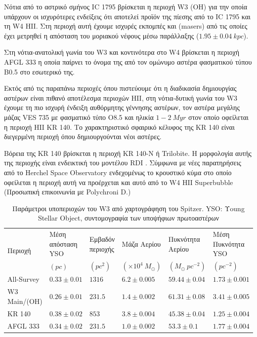 \documentclass[a4paper,12pt]{memoir}
\newcommand{\e}[1]{\times 10^{#1}}
\begin{document}
Νότια από το αστρικό σμήνος IC 1795 βρίσκεται η περιοχή W3 (OH) για την οποία υπάρχουν οι ισχυρότερες ενδείξεις ότι αποτελεί προϊόν της πίεσης από το IC 1795 και τη  W4 HII. Στη περιοχή αυτή έχουμε ισχυρές εκπομπές  και  (masers) από τις οποίες έχει μετρηθεί η απόσταση του μοριακού νέφους μέσω παράλλαξης ($1.95 \pm 0.04 \ kpc$).

Στη νότια-ανατολική γωνία του W3 και κοντινότερα στο W4 βρίσκεται η περιοχή AFGL 333 η οποία παίρνει το όνομα της από τον ομώνυμο αστέρα φασματικού τύπου B0.5 στο εσωτερικό της. 

Εκτός από τις παραπάνω περιοχές όπου πιστεύουμε ότι η διαδικασία δημιουργίας αστέρων είναι πιθανό αποτέλεσμα περιοχών HII, στη νότια-δυτική γωνία του W3 έχουμε τη πιο ισχυρή ένδειξη αυθόρμητης γέννησης αστέρων, τον αστέρα μεγάλης μάζας VES 735 με φασματικό τύπο O8.5 και ηλικία $1-2 \ Myr$ στον οποίο οφείλεται η περιοχή HII KR 140. Το χαρακτηριστικό σφαιρικό κέλυφος της KR 140 είναι διεγερμένη περιοχή όπου δημιουργούνται νέοι αστέρες. 

Βόρεια της KR 140 βρίσκεται η περιοχή KR 140-N ή Trilobite. Η μορφολογία αυτής της περιοχής είναι ενδεικτική του μοντέλου RDI \cite{rivera-ingraham_2013}. Σύμφωνα με νέες παρατηρήσεις από το Herchel Space Observatory ενδεχομένως το κρουστικό κύμα στο οποίο οφείλεται η περιοχή αυτή να προέρχεται και αυτό από το W4 HII Superbubble (Προσωπική επικοινωνία με Polychroni D.)

\begin{table}
	\caption{Παράμετροι υποπεριοχών του W3 από χαρτογράφηση του Spitzer. YSO: Υoung Stellar Object, συντομογραφία των υποψήφιων πρωτοαστέρων}
	\begin{tabular}{p{} p{2.5cm} p{1.5cm} p{2cm} p{2.2cm} p{2.5cm}}
		\toprule
		\multirow{2}{*}{Περιοχή} & Μέση απόσταση YSO & Εμβαδόν περιοχής & Μάζα Αερίου & Πυκνότητα Αερίου & Μέση Πυκνότητα YSO \\ 
		&  $(pc)$ & $(pc^2)$ & $(\e{4} \ M_{\odot})$ & $(M_{\odot} \ pc^{-2})$ & $ (pc^{-2}) $ \\
		\midrule
		All-Survey & $0.33 \pm 0.01$ & $1316$ & $6.2\pm0.005$ & $59.44\pm 0.04$ & $1.73\pm 0.001$ \\
	  W3 Main/(OH) & $0.26 \pm 0.01$ & $231.5$ & $1.4\pm0.002$ & $61.31\pm 0.08$ & $3.41\pm 0.005$ \\
	  KR 140 & $0.38 \pm 0.02$ & $853$ & $3.8\pm0.004$ & $45.38\pm 0.04$ & $1.25\pm 0.004$ \\
	  AFGL 333 & $0.34 \pm 0.02$ & $231.5$ & $1.0\pm0.002$ & $53.3\pm 0.1$ & $1.77\pm 0.004$ \\  
		\bottomrule		
	\end{tabular}
\end{table}
\end{document}
